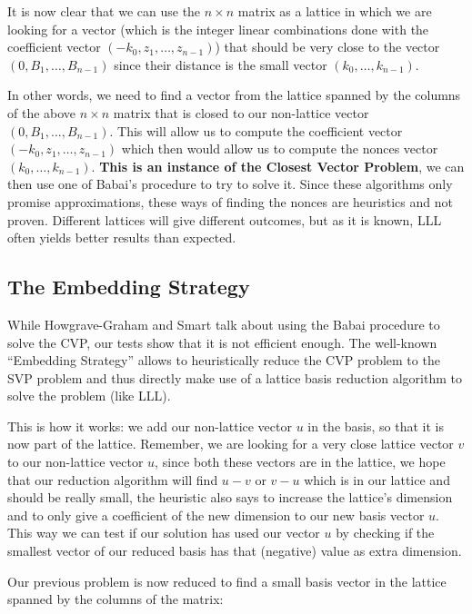 \documentclass[a4paper,11pt]{article}
\begin{document}
It is now clear that we can use the $n \times n$ matrix as a lattice in which we are looking for a vector (which is the integer linear combinations done with the coefficient vector $(-k_0, z_1, \hdots, z_{n-1})$) that should be very close to the vector $(0, B_1 , \hdots, B_{n-1})$ since their distance is the small vector $(k_0, \hdots, k_{n-1})$.

In other words, we need to find a vector from the lattice spanned by the columns of the above $n \times n$ matrix that is closed to our non-lattice vector $(0, B_1 , \hdots, B_{n-1})$. This will allow us to compute the coefficient vector $(-k_0, z_1, \hdots, z_{n-1})$ which then would allow us to compute the nonces vector $(k_0, \hdots, k_{n-1})$. \textbf{This is an instance of the Closest Vector Problem}, we can then use one of Babai's procedure to try to solve it. Since these algorithms only promise approximations, these ways of finding the nonces are heuristics and not proven. Different lattices will give different outcomes, but as it is known, LLL often yields better results than expected.

\subsection{The Embedding Strategy}

While Howgrave-Graham and Smart talk about using the Babai procedure to solve the CVP, our tests show that it is not efficient enough. The well-known ``Embedding Strategy'' allows to heuristically reduce the CVP problem to the SVP problem and thus directly make use of a lattice basis reduction algorithm to solve the problem (like LLL).

This is how it works: we add our non-lattice vector $u$ in the basis, so that it is now part of the lattice. Remember, we are looking for a very close lattice vector $v$ to our non-lattice vector $u$, since both these vectors are in the lattice, we hope that our reduction algorithm will find $u - v$ or $v - u$ which is in our lattice and should be really small, the heuristic also says to increase the lattice's dimension and to only give a coefficient of the new dimension to our new basis vector $u$. This way we can test if our solution has used our vector $u$ by checking if the smallest vector of our reduced basis has that (negative) value as extra dimension.

Our previous problem is now reduced to find a small basis vector in the lattice spanned by the columns of the matrix:
\end{document}
